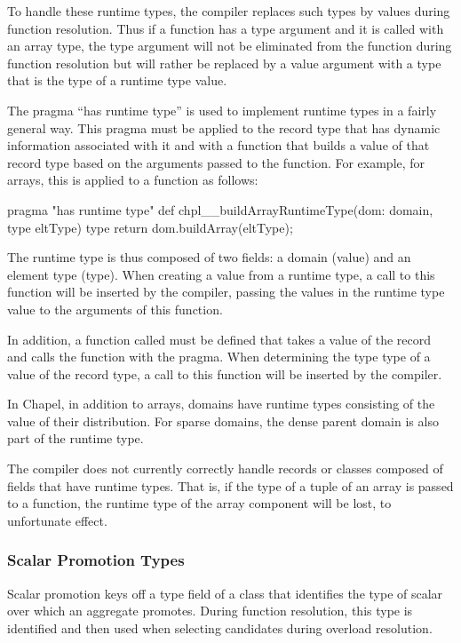\documentclass[10pt]{article}
\begin{document}
To handle these runtime types, the compiler replaces such types by
values during function resolution.  Thus if a function has a type
argument and it is called with an array type, the type argument will
not be eliminated from the function during function resolution but
will rather be replaced by a value argument with a type that is the
type of a runtime type value.

The pragma ``has runtime type'' is used to implement runtime types in
a fairly general way.  This pragma must be applied to the record type
that has dynamic information associated with it and with a function
that builds a value of that record type based on the arguments passed
to the function.  For example, for arrays, this is applied to a
function as follows:
\begin{chapel}
pragma "has runtime type"
def chpl__buildArrayRuntimeType(dom: domain, type eltType) type
  return dom.buildArray(eltType);
\end{chapel}
The runtime type is thus composed of two fields: a domain (value) and
an element type (type).  When creating a value from a runtime type, a
call to this function will be inserted by the compiler, passing the
values in the runtime type value to the arguments of this function.

In addition, a function called 
must be defined that takes a value of the record and calls the
function with the pragma.  When determining the type type of a value
of the record type, a call to this function will be inserted by the
compiler.

In Chapel, in addition to arrays, domains have runtime types
consisting of the value of their distribution.  For sparse domains,
the dense parent domain is also part of the runtime type.

The compiler does not currently correctly handle records or classes
composed of fields that have runtime types.  That is, if the type of a
tuple of an array is passed to a function, the runtime type of the
array component will be lost, to unfortunate effect.

\subsubsection{Scalar Promotion Types}

Scalar promotion keys off a type field of a class that identifies the
type of scalar over which an aggregate promotes.  During function
resolution, this type is identified and then used when selecting
candidates during overload resolution.
\end{document}
